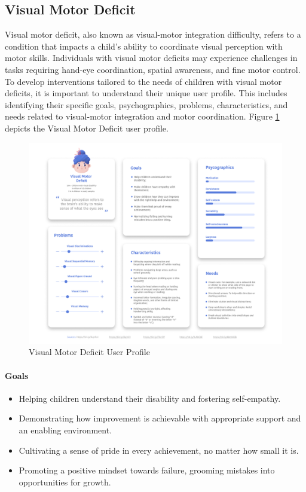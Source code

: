 \subsection{Visual Motor Deficit}
Visual motor deficit, also known as visual-motor integration difficulty, refers to a condition that impacts a child's ability to coordinate visual perception with motor skills. Individuals with visual motor deficits may experience challenges in tasks requiring hand-eye coordination, spatial awareness, and fine motor control. To develop interventions tailored to the needs of children with visual motor deficits, it is important to understand their unique user profile. This includes identifying their specific goals, psychographics, problems, characteristics, and needs related to visual-motor integration and motor coordination. Figure \ref{fig:VMDUserProfile} depicts the Visual Motor Deficit user profile.

\begin{figure}[H]
    \centering
    \includegraphics[width=0.9\linewidth]{Chapters/figma/Visual Motor Deficit.png}
    \caption{Visual Motor Deficit User Profile}
    \label{fig:VMDUserProfile}
\end{figure}

\paragraph{Goals}
\begin{itemize}
    \item Helping children understand their disability and fostering self-empathy.
    \item Demonstrating how improvement is achievable with appropriate support and an enabling environment.
    \item Cultivating a sense of pride in every achievement, no matter how small it is.
    \item Promoting a positive mindset towards failure, grooming mistakes into opportunities for growth.
\end{itemize}

